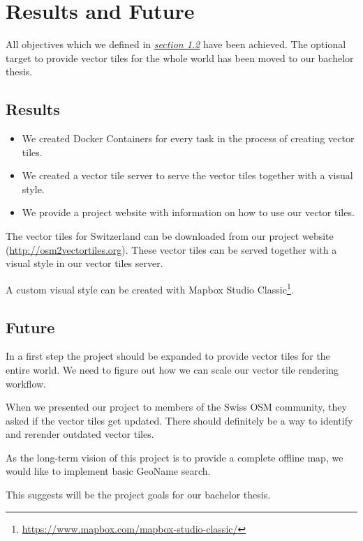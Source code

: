 \chapter{Results and Future}

All objectives which we defined in \hyperref[targets]{\emph{section 1.2}} have been achieved. The optional target to provide vector tiles for the whole world has been moved to our bachelor thesis.

\section{Results}

\begin{itemize}
\item
  We created Docker Containers for every task in the process of creating vector tiles.
\item
  We created a vector tile server to serve the vector tiles together with a visual style.
\item
  We provide a project website with information on how to use our vector tiles.
\end{itemize}

The vector tiles for Switzerland can be downloaded from our project website (\url{http://osm2vectortiles.org}). These vector tiles can be served together with a visual style in our vector tiles server.

A custom visual style can be created with Mapbox Studio Classic\footnote{\url{https://www.mapbox.com/mapbox-studio-classic/}}.

\section{Future}
In a first step the project should be expanded to provide vector tiles for the entire world. We need to figure out how we can scale our vector tile rendering workflow.

When we presented our project to members of the Swiss OSM community, they asked if the vector tiles get updated. There should definitely be a way to identify and rerender outdated vector tiles.

As the long-term vision of this project is to provide a complete offline map, we would like to implement basic GeoName search.

This suggests will be the project goals for our bachelor thesis.

\newpage
